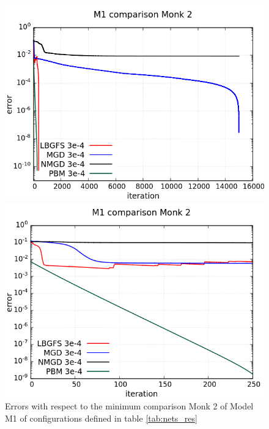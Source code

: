 \begin{figure}[H]
	\centering
	\begin{minipage}[t]{0.5\linewidth}
		\includegraphics[width=\linewidth]{data/Comparison/Monk2/Monk2_M1_error_standard.png}
	\end{minipage}%
	\begin{minipage}[t]{0.5\linewidth}
		\includegraphics[width=\linewidth]{data/Comparison/Monk2/Monk2_M1_error_zoom.png}
	\end{minipage}
	\caption{Errors with respect to the minimum comparison Monk 2 of Model M1 of configurations defined in table \ref{tab:nets_res}}
	\label{R-Monk2-M1}
\end{figure}
